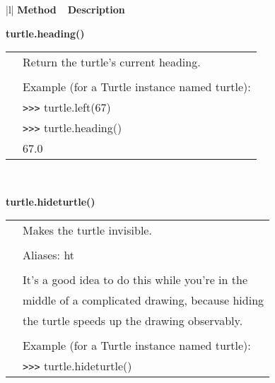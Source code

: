 \begin{center}
{\small
\begin{tabular}{|l|} \hline
{\bf Method~~Description}  \\ \hline\hline 

{\bf    turtle.heading()} \\
   \begin{tabular}{p{0.25in}p{4in}}
&        Return the turtle's current heading. \\
&  \\
&        Example (for a Turtle instance named turtle): \\
&        \verb+>+\verb+>+\verb+>+ turtle.left(67) \\
&        \verb+>+\verb+>+\verb+>+ turtle.heading() \\
&        67.0 \\
\end{tabular} \\ \hline

{\bf    turtle.hideturtle()} \\
   \begin{tabular}{p{0.25in}p{4in}}
&        Makes the turtle invisible. \\
&  \\
&        Aliases:  ht \\
&  \\
&        It's a good idea to do this while you're in the \\
&        middle of a complicated drawing, because hiding \\
&        the turtle speeds up the drawing observably. \\
&  \\
&        Example (for a Turtle instance named turtle): \\
&        \verb+>+\verb+>+\verb+>+ turtle.hideturtle() \\
\end{tabular} \\ \hline


\end{tabular}}
\end{center}
